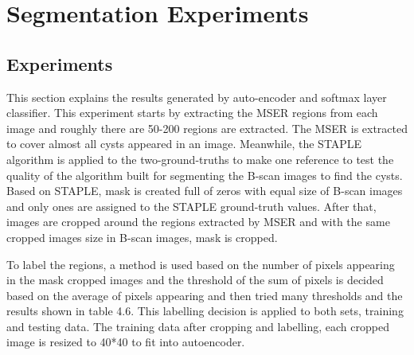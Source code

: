 \section{Segmentation Experiments}
\subsection{Experiments}
This section explains the results generated by auto-encoder and softmax layer classifier.
This experiment starts by extracting the MSER regions from each image and roughly there are 50-200 regions are extracted.
The MSER is extracted to cover almost all cysts appeared in an image.
Meanwhile, the STAPLE algorithm is applied to the two-ground-truths to make one reference to test the quality of the algorithm built for segmenting the B-scan images to find the cysts.
Based on STAPLE, mask is created full of zeros with equal size of B-scan images and only ones are assigned to the STAPLE ground-truth values. 
After that, images are cropped around the regions extracted by MSER and with the same cropped images size in B-scan images, mask is cropped.

To label the regions, a method is used based on the number of pixels appearing in the mask cropped images and the threshold of the sum of pixels is decided based on the average of pixels appearing and then tried many thresholds and the results shown in table 4.6.
This labelling decision is applied to both sets, training and testing data.
The training data after cropping and labelling, each cropped image is resized to 40*40 to fit into autoencoder.

